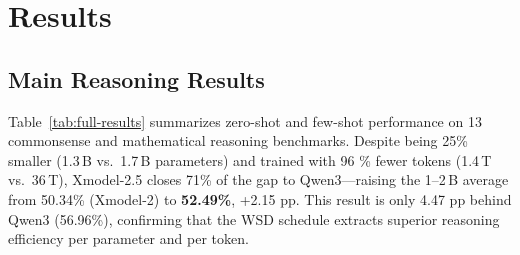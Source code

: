 \section{Results}

\subsection{Main Reasoning Results}
Table~\ref{tab:full-results} summarizes zero-shot and few-shot performance on 13 commonsense and mathematical reasoning benchmarks. Despite being 25\% smaller (1.3\,B vs.\ 1.7\,B parameters) and trained with 96 \% fewer tokens (1.4\,T vs.\ 36\,T), Xmodel-2.5 closes 71\% of the gap to Qwen3—raising the 1--2\,B average from 50.34\% (Xmodel-2) to \textbf{52.49\%}, +2.15 pp. This result is only 4.47 pp behind Qwen3 (56.96\%), confirming that the WSD schedule extracts superior reasoning efficiency per parameter and per token.

